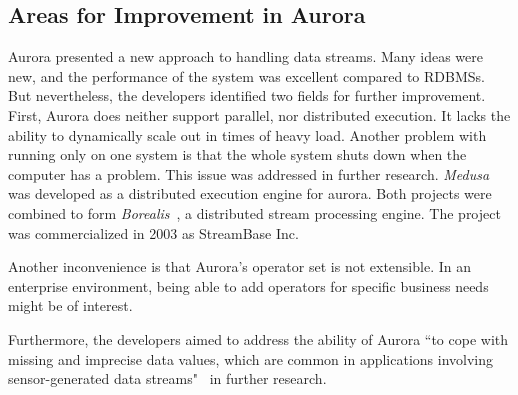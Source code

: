 \subsection{Areas for Improvement in Aurora}\label{auroraImprovement}
Aurora presented a new approach to handling data streams. Many ideas were new, and the performance of the system was excellent compared to RDBMSs. But nevertheless, the developers identified two fields for further improvement. First, Aurora does neither support parallel, nor distributed execution. It lacks the ability to dynamically scale out in times of heavy load. Another problem with running only on one system is that the whole system shuts down when the computer has a problem. This issue was addressed in further research. \textit{Medusa} was developed as a distributed execution engine for aurora. Both projects were combined to form \textit{Borealis}~\cite{AuroraBorealis2016}, a distributed stream processing engine. The project was commercialized in 2003 as StreamBase Inc.

Another inconvenience is that Aurora's operator set is not extensible. In an enterprise environment, being able to add operators for specific business needs might be of interest.

Furthermore, the developers aimed to address the ability of Aurora ``to cope with missing and imprecise data values, which are common in applications involving sensor-generated data streams"~\cite{Aurora2003} in further research.
